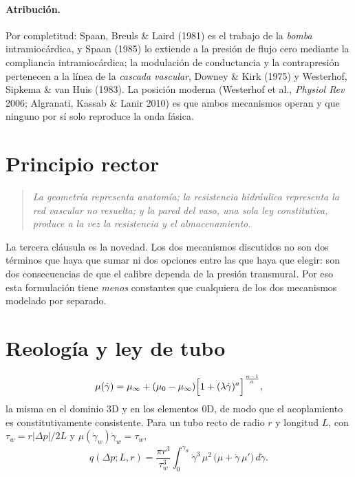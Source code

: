 \documentclass[11pt]{article}
\begin{document}
\paragraph{Atribuci\'on.} Por completitud: Spaan, Breuls \& Laird (1981) es el
trabajo de la \emph{bomba} intramioc\'ardica, y Spaan (1985) lo extiende a la
presi\'on de flujo cero mediante la compliancia intramioc\'ardica; la
modulaci\'on de conductancia y la contrapresi\'on pertenecen a la l\'inea de la
\emph{cascada vascular}, Downey \& Kirk (1975) y Westerhof, Sipkema \& van Huis
(1983). La posici\'on moderna (Westerhof et al., \emph{Physiol Rev} 2006;
Algranati, Kassab \& Lanir 2010) es que ambos mecanismos operan y que ninguno
por s\'i solo reproduce la onda f\'asica.

\section{Principio rector}

\begin{quote}
\emph{La geometr\'ia representa anatom\'ia; la resistencia hidr\'aulica
representa la red vascular no resuelta; y la pared del vaso, una sola ley
constitutiva, produce a la vez la resistencia y el almacenamiento.}
\end{quote}

\noindent
La tercera cl\'ausula es la novedad. Los dos mecanismos discutidos no son dos
t\'erminos que haya que sumar ni dos opciones entre las que haya que elegir:
son dos consecuencias de que el calibre dependa de la presi\'on transmural. Por
eso esta formulaci\'on tiene \emph{menos} constantes que cualquiera de los dos
mecanismos modelado por separado.

\section{Reolog\'ia y ley de tubo}

\begin{equation}
  \mu(\dot\gamma)=\mu_\infty+(\mu_0-\mu_\infty)
  \Bigl[1+(\lambda\dot\gamma)^{a}\Bigr]^{\frac{n-1}{a}} ,
  \label{eq:cy}
\end{equation}
la misma en el dominio 3D y en los elementos 0D, de modo que el acoplamiento es
constitutivamente consistente. Para un tubo recto de radio $r$ y longitud $L$,
con $\tau_w=r|\Delta p|/2L$ y $\mu(\dot\gamma_w)\dot\gamma_w=\tau_w$,
\begin{equation}
  q(\Delta p;L,r)=\frac{\pi r^3}{\tau_w^{3}}
  \int_{0}^{\dot\gamma_w}\!\dot\gamma^{3}\,\mu^2\,
  \bigl(\mu+\dot\gamma\,\mu'\bigr)\,d\dot\gamma .
  \label{eq:wrms}
\end{equation}
\end{document}

